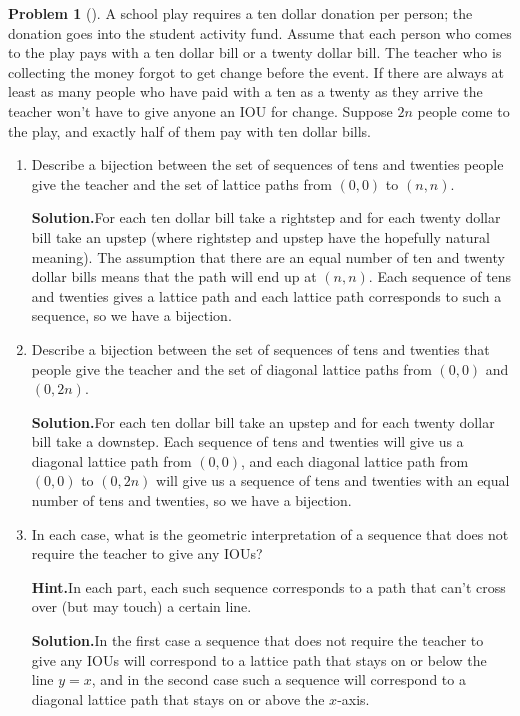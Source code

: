 \documentclass[10pt,]{book}
\theoremstyle{plain}
\theoremstyle{definition}
\newtheorem{activity}[project]{Problem}
\theoremstyle{definition}
\numberwithin{equation}{chapter}
\begin{document}
\begin{activity}[]\label{activity-50}
A school play requires a ten dollar donation per person; the donation goes into the student activity fund. Assume that each person who comes to the play pays with a ten dollar bill or a twenty dollar bill. The teacher who is collecting the money forgot to get change before the event. If there are always at least as many people who have paid with a ten as a twenty as they arrive the teacher won't have to give anyone an IOU for change. Suppose \(2n\) people come to the play, and exactly half of them pay with ten dollar bills.%
\begin{enumerate}[font=\bfseries,label=(\alph*),ref=\alph*]
\item\label{task-49} Describe a bijection between the set of sequences of tens and twenties people give the teacher and the set of lattice paths from \((0,0)\) to \((n,n)\).%
\par\medskip\noindent%
\textbf{Solution.}\quad For each ten dollar bill take a rightstep and for each twenty dollar bill take an upstep (where rightstep and upstep have the hopefully natural meaning). The assumption that there are an equal number of ten and twenty dollar bills means that the path will end up at \((n,n)\). Each sequence of tens and twenties gives a lattice path and each lattice path corresponds to such a sequence, so we have a bijection.%
\item\label{task-50} Describe a bijection between the set of sequences of tens and twenties that people give the teacher and the set of diagonal lattice paths from \((0,0)\) and \((0,2n)\).%
\par\medskip\noindent%
\textbf{Solution.}\quad For each ten dollar bill take an upstep and for each twenty dollar bill take a downstep. Each sequence of tens and twenties will give us a diagonal lattice path from \((0,0)\), and each diagonal lattice path from\((0,0)\) to \((0,2n)\) will give us a sequence of tens and twenties with an equal number of tens and twenties, so we have a bijection.%
\item\label{task-51} In each case, what is the geometric interpretation of a sequence that does not require the teacher to give any IOUs?%
\par\medskip\noindent%
\textbf{Hint.}\quad In each part, each such sequence corresponds to a path that can't cross over (but may touch) a certain line.%
\par\medskip\noindent%
\textbf{Solution.}\quad In the first case a sequence that does not require the teacher to give any IOUs will correspond to a lattice path that stays on or below the line \(y=x\), and in the second case such a sequence will correspond to a diagonal lattice path that stays on or above the \(x\)-axis.%
\end{enumerate}
\end{activity}
\end{document}
